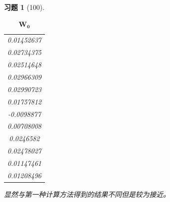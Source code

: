 \documentclass[a4paper, UTF8]{ctexart}
\newtheorem*{exercise}{\textbf{习题}}
\begin{document}
\begin{exercise}[100]
\begin{table}[htbp!]
\begin{tabular}{c}
       0.01452637 \\
       0.02734375 \\
       0.02514648 \\
       0.02966309 \\
       0.02990723 \\
       0.01757812 \\
      -0.0098877  \\
       0.00708008 \\
       0.0246582  \\
       0.02478027 \\
       0.01147461 \\
       0.01208496 \\
    \end{tabular}
    \caption{$\mathbf{W_0}$}
  \end{table}
  显然与第一种计算方法得到的结果不同但是较为接近。
  \end{exercise}
\end{document}
